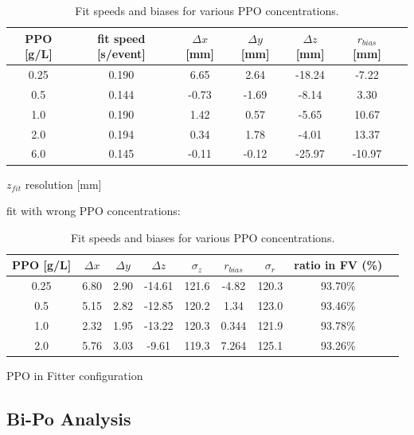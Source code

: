 \begin{table}[ht]
	\centering
	\caption{\label{partial_bias} Fit speeds and biases for various PPO concentrations.}	
	{\centering
		\begin{tabular*}{145         mm}{c@{\extracolsep{\fill}}cccccc}
			\toprule 
			PPO [g/L] & fit speed [s/event]& $\Delta x$ [mm]& $\Delta y$ [mm]& $\Delta z$ [mm] & $r_{bias}$ [mm] & \\
			\midrule
			0.25 & 0.190 &6.65 &2.64& -18.24& -7.22\\
			0.5  & 0.144 &-0.73 &-1.69& -8.14& 3.30 \\
			1.0 &0.190 & 1.42 &0.57 &-5.65& 10.67 \\
			2.0 &0.194 & 0.34 &1.78& -4.01& 13.37	\\
			6.0 &0.145 & -0.11& -0.12& -25.97& -10.97\\
			\bottomrule	
		\end{tabular*}
	}
\end{table}

$z_{fit}$ resolution [mm] 


fit with wrong PPO concentrations:  
\begin{table}[ht]
	\centering
	\caption{\label{partial_bias1} Fit speeds and biases for various PPO concentrations.}	
	{\centering
		\begin{tabular*}{140mm}{c@{\extracolsep{\fill}}cccccccc}
			\toprule 
			PPO [g/L] & $\Delta x$ & $\Delta y$ & $\Delta z$  & $\sigma_z$ & $r_{bias}$  & $\sigma_r$ & ratio in FV (\%)&\\
			\midrule
			0.25 & 6.80& 2.90& -14.61& 121.6& -4.82& 120.3& 93.70\%\\
			0.5  & 5.15& 2.82& -12.85 &120.2 &1.34 &123.0 &93.46\% \\
			1.0 &2.32 &1.95 &-13.22& 120.3& 0.344& 121.9 &93.78\% \\
			2.0 &5.76& 3.03& -9.61& 119.3& 7.264 &125.1& 93.26\% \\
			\bottomrule	
		\end{tabular*}
	}
\end{table}



PPO in Fitter
configuration


\subsection{Bi-Po Analysis}

